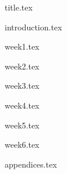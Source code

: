 \documentclass[final]{scrreprt} %
\begin{document}

{title.tex}
\newpage
\tableofcontents

\newpage
{}
{introduction.tex}

\newpage
{week1.tex}

\newpage
{week2.tex}

\newpage
{week3.tex}

\newpage
{week4.tex}

\newpage
{week5.tex}

\newpage
{week6.tex}

\newpage
{}

\printbibliography
{appendices.tex}
\end{document}

